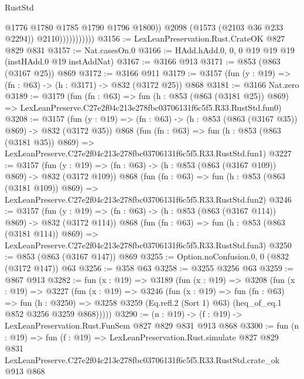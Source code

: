 \begin{lexlean}{RustStd}
\begin{coremodule}
                              @1776
                              @1780
                              @1785
                              @1790
                              @1796
                              @1800))
                          @2098
                          (@1573 (@2103 @36 @233 @2294))
                          @2110)))))))))))
@3156 := LexLeanPreservation.Rust.CrateOK @827 @829 @831
@3157 := Nat.casesOn.{0}
@3166 := HAdd.hAdd.{0, 0, 0} @19 @19 @19 (instHAdd.{0} @19 instAddNat)
@3167 := @3166 @913
@3171 := @853 (@863 (@3167 @25)) @869
@3172 := @3166 @911
@3179 := @3157 (fun (y : @19) => (fn : @63) -> (h : @3171) -> @832 (@3172 @25)) @868
@3181 := @3166 Nat.zero
@3189 := @3179
    (fun (fn : @63) =>
    fun (h : @853 (@863 (@3181 @25)) @869) =>
    LexLeanPreserve.C27e2f04c213e278fbc03706131f6c5f5.R33.RustStd.fun0)
@3208 := @3157
    (fun (y : @19) => (fn : @63) -> (h : @853 (@863 (@3167 @35)) @869) -> @832 (@3172 @35))
    @868
    (fun (fn : @63) =>
    fun (h : @853 (@863 (@3181 @35)) @869) =>
    LexLeanPreserve.C27e2f04c213e278fbc03706131f6c5f5.R33.RustStd.fun1)
@3227 := @3157
    (fun (y : @19) => (fn : @63) -> (h : @853 (@863 (@3167 @109)) @869) -> @832 (@3172 @109))
    @868
    (fun (fn : @63) =>
    fun (h : @853 (@863 (@3181 @109)) @869) =>
    LexLeanPreserve.C27e2f04c213e278fbc03706131f6c5f5.R33.RustStd.fun2)
@3246 := @3157
    (fun (y : @19) => (fn : @63) -> (h : @853 (@863 (@3167 @114)) @869) -> @832 (@3172 @114))
    @868
    (fun (fn : @63) =>
    fun (h : @853 (@863 (@3181 @114)) @869) =>
    LexLeanPreserve.C27e2f04c213e278fbc03706131f6c5f5.R33.RustStd.fun3)
@3250 := @853 (@863 (@3167 @147)) @869
@3255 := Option.noConfusion.{0, 0} (@832 (@3172 @147)) @63
@3256 := @358 @63
@3258 := @3255 @3256 @63
@3259 := @867 @913
@3282 := fun (x : @19) =>
  @3189
    (fun (x : @19) =>
    @3208
      (fun (x : @19) =>
      @3227
        (fun (x : @19) =>
        @3246
          (fun (x : @19) =>
          fun (fn : @63) =>
          fun (h : @3250) =>
          @3258 @3259 (Eq.refl.{2} (Sort 1) @63) (heq_of_eq.{1} @852 @3256 @3259 @868)))))
@3290 := (n : @19) -> (f : @19) -> LexLeanPreservation.Rust.FunSem @827 @829 @831 @913 @868
@3300 := fun (n : @19) =>
  fun (f : @19) =>
  LexLeanPreservation.Rust.simulate
    @827
    @829
    @831
    LexLeanPreserve.C27e2f04c213e278fbc03706131f6c5f5.R33.RustStd.crate_ok
    @913
    @868
\end{coremodule}
\end{lexlean}
